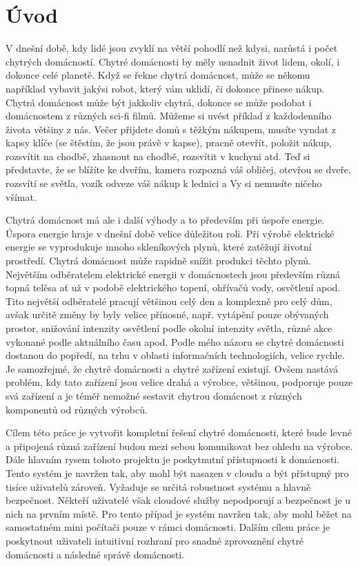 \chapter{Úvod}

V dnešní době, kdy lidé jsou zvyklí na větší pohodlí než kdysi, narůstá i počet chytrých domácností. Chytré domácnosti by měly usnadnit život lidem, okolí, i dokonce celé planetě. Když se řekne chytrá domácnost, může se někomu například vybavit jakýsi robot, který vám uklidí, či dokonce přinese nákup.
Chytrá domácnost může být jakkoliv chytrá, dokonce se může podobat i domácnostem z různých sci-fi filmů. Můžeme si uvést příklad z každodenního života většiny z nás. Večer
přijdete domů s těžkým nákupem, musíte vyndat z kapsy klíče (se štěstím, že jsou
právě v kapse), pracně otevřít, položit nákup, rozsvítit na chodbě, zhasnout na chodbě,
rozsvítit v kuchyni atd.
Teď si představte, že se blížíte ke dveřím, kamera rozpozná váš
obličej, otevřou se dveře, rozsvítí se světla, vozík odveze váš nákup k lednici a Vy si nemusíte ničeho všímat.

Chytrá domácnost má ale i další výhody a to především při úspoře energie. Úspora energie hraje v dnešní době velice důležitou roli. Při výrobě elektrické energie se vyprodukuje mnoho skleníkových plynů, které zatěžují životní prostředí.
Chytrá domácnost může rapidně snížit produkci těchto plynů. Největším odběratelem elektrické energii v domácnostech jsou především různá topná telěsa ať už v podobě elektrického topení, ohřívačů vody, osvětlení apod.
Tito největší odběratelé pracují většinou celý den a komplexně pro celý dům, avšak určitě změny by byly velice přínosné, např. vytápění pouze obývaných prostor, snižování intenzity osvětlení podle okolní intenzity světla, různé akce vykonané podle aktuálního času apod.
Podle mého názoru se chytré domácnosti dostanou do popředí, na trhu v oblasti informačních technologiích, velice rychle. Je samozřejmé, že chytré domácnosti a chytré zařízení existují.
Ovšem nastává problém, kdy tato zařízení jsou velice drahá a výrobce, většinou, podporuje pouze svá zařízení a je téměř nemožné sestavit chytrou domácnost z různých komponentů od různých výrobců.

Cílem této práce je vytvořit kompletní řešení chytré domácnosti, které bude levné a připojená různá zařízení budou mezi sebou komunikovat bez ohledu na výrobce.
Dále hlavním rysem tohoto projektu je poskytnutní přístupnosti k domácnosti. Tento systém je navržen tak, aby mohl být nasazen v cloudu a být přístupný pro tisíce uživatelů zároveň. Vyžaduje se určitá robustnost systému a hlavně bezpečnost.
Někteří uživatelé však cloudové služby nepodporují a bezpečnost je u nich na prvním místě. Pro tento případ je systém navržen tak, aby mohl běžet na samostatném mini počítači pouze v rámci domácnosti. Dalším cílem práce je poskytnout uživateli
intuitivní rozhraní pro snadné zprovoznění chytré domácnosti a následné správě domácnosti.


